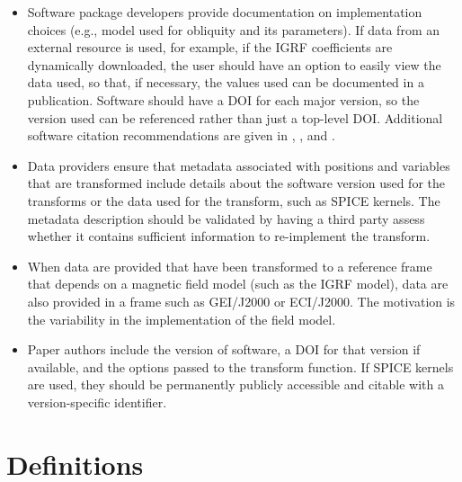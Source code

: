\documentclass[draft]{agujournal2019}
\begin{document}
\begin{itemize}
  \item Software package developers provide documentation on implementation choices (e.g., model used for obliquity and its parameters). If data from an external resource is used, for example, if the IGRF coefficients are dynamically downloaded, the user should have an option to easily view the data used, so that, if necessary, the values used can be documented in a publication.
  Software should have a DOI for each major version, so the version used can be referenced rather than just a top-level DOI. Additional software citation recommendations are given in , , and .

  \item Data providers ensure that metadata associated with positions and variables that are transformed include details about the software version used for the transforms or the data used for the transform, such as SPICE kernels. The metadata description should be validated by having a third party assess whether it contains sufficient information to re-implement the transform.

  \item When data are provided that have been transformed to a reference frame that depends on a magnetic field model (such as the IGRF model), data are also provided in a frame such as GEI/J2000 or ECI/J2000. The motivation is the variability in the implementation of the field model. 
  
  \item Paper authors include the version of software, a DOI for that version if available, and the options passed to the transform function. If SPICE kernels are used, they should be permanently publicly accessible and citable with a version-specific identifier. 

\end{itemize}

\appendix
\section{Definitions}
\label{sect:glossary}
\end{document}

